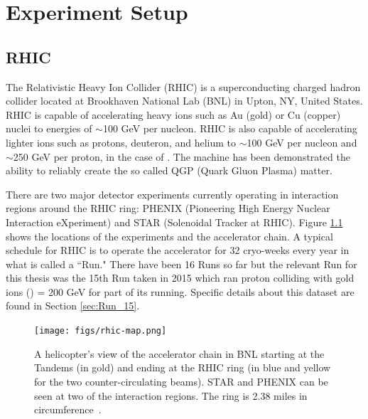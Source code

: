 \chapter{Experiment Setup}
\section{RHIC}
The Relativistic Heavy Ion Collider (RHIC) is a superconducting charged hadron collider located at Brookhaven National Lab (BNL) in Upton, NY, United States. RHIC is capable of accelerating heavy ions such as Au (gold) or Cu (copper) nuclei to energies of $\sim$100 GeV per nucleon. RHIC is also capable of accelerating lighter ions such as protons, deuteron, and helium to $\sim	$100 GeV per nucleon and $\sim$250 GeV per proton, in the case of \pp. The machine has been demonstrated the ability to reliably create the so called QGP (Quark Gluon Plasma) matter.

There are two major detector experiments currently operating in interaction regions around the RHIC ring: PHENIX (Pioneering High Energy Nuclear Interaction eXperiment) and STAR (Solenoidal Tracker at RHIC). Figure \ref{fig:rhic_heli_photo} shows the locations of the experiments and the accelerator chain. A typical schedule for RHIC is to operate the accelerator for 32 cryo-weeks every year in what is called a ``Run." There have been 16 Runs so far but the relevant Run for this thesis was the 15th Run taken in 2015 which ran proton colliding with gold ions (\pau) \sqsn = 200 GeV for part of its running. Specific details about this dataset are found in Section \ref{sec:Run_15}.

\begin{figure}[!ht]
\centering
\texttt{[image: figs/rhic-map.png]}
\caption{A helicopter's view of the accelerator chain in BNL starting at the Tandems (in gold) and ending at the RHIC ring (in blue and yellow for the two counter-circulating beams). STAR and PHENIX can be seen at two of the interaction regions. The ring is 2.38 miles in circumference~\cite{Tannenbaum:2013wkn}.}
\label{fig:rhic_heli_photo}
\end{figure}

